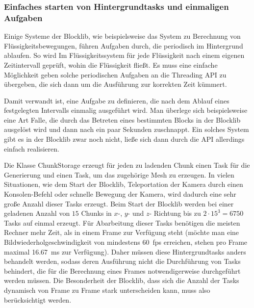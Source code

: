 \subsubsection{Einfaches starten von Hintergrundtasks und einmaligen Aufgaben}\label{sec:reqBackgroundTasks}
Einige Systeme der Blocklib, wie beispielsweise das System zu Berechnung von Flüssigkeitsbewegungen, führen Aufgaben durch, die periodisch im Hintergrund ablaufen. So wird Im Flüssigkeitssystem für jede Flüssigkeit nach einem eigenen Zeitintervall geprüft, wohin die Flüssigkeit fließt. Es muss eine einfache Möglichkeit geben solche periodischen Aufgaben an die Threading API zu übergeben, die sich dann um die Ausführung zur korrekten Zeit kümmert.

Damit verwandt ist, eine Aufgabe zu definieren, die nach dem Ablauf eines festgelegten Intervalls einmalig ausgeführt wird. Man überlege sich beispielsweise eine Art Falle, die durch das Betreten eines bestimmten Blocks in der Blocklib ausgelöst wird und dann nach ein paar Sekunden zuschnappt. Ein solches System gibt es in der Blocklib zwar noch nicht, ließe sich dann durch die API allerdings einfach realisieren.

Die Klasse ChunkStorage erzeugt für jeden zu ladenden Chunk einen Task für die Generierung und einen Task, um das zugehörige Mesh zu erzeugen. In vielen Situationen, wie dem Start der Blocklib, Teleportation der Kamera durch einen Konsolen-Befehl oder schnelle Bewegung der Kamera, wird dadurch eine sehr große Anzahl dieser Tasks erzeugt. Beim Start der Blocklib werden bei einer geladenen Anzahl von $15$ Chunks in  $x$-, $y$- und $z$- Richtung bis zu $2\cdot15^3=6750$  Tasks auf einmal erzeugt. Für Abarbeitung dieser Tasks benötigen die meisten Rechner mehr Zeit, als in einem Frame zur Verfügung steht (möchte man eine Bildwiederholgeschwindigkeit von mindestens 60~\ac{fps} erreichen, stehen pro Frame maximal \SI{16,67}{\milli\second} zur Verfügung). Daher müssen diese Hintergrundtasks anders behandelt werden, sodass deren Ausführung nicht die Durchführung von Tasks behindert, die für die Berechnung eines Frames notwendigerweise durchgeführt werden müssen. Die Besonderheit der Blocklib, dass sich die Anzahl der Tasks  dynamisch von Frame zu Frame stark unterscheiden kann, muss also berücksichtigt werden.